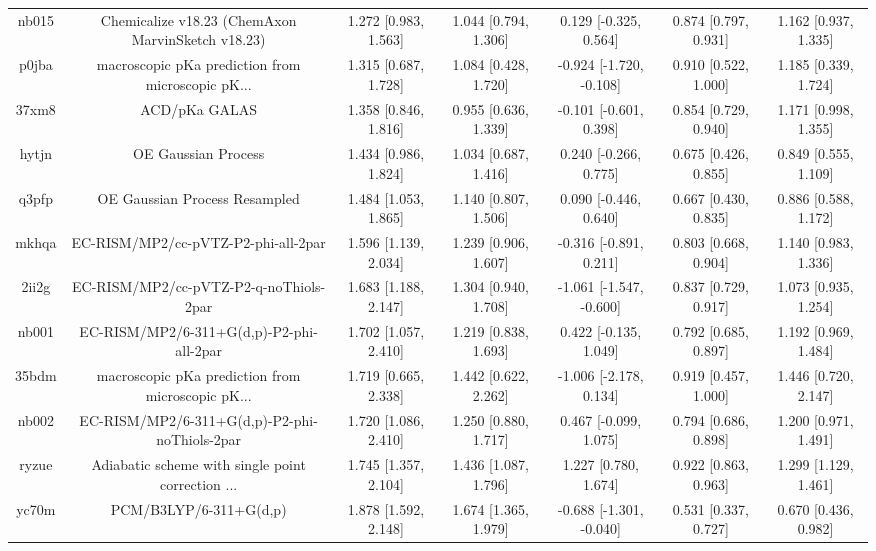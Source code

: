 \documentclass{article}
\begin{document}
\begin{center}
\begin{longtable}{|ccccccc|}
 nb015 &  Chemicalize v18.23 (ChemAxon MarvinSketch v18.23) &  1.272 [0.983, 1.563] &  1.044 [0.794, 1.306] &    0.129 [-0.325, 0.564] &  0.874 [0.797, 0.931] &   1.162 [0.937, 1.335] \\
 p0jba &  macroscopic pKa prediction from microscopic pK... &  1.315 [0.687, 1.728] &  1.084 [0.428, 1.720] &  -0.924 [-1.720, -0.108] &  0.910 [0.522, 1.000] &   1.185 [0.339, 1.724] \\
 37xm8 &                                      ACD/pKa GALAS &  1.358 [0.846, 1.816] &  0.955 [0.636, 1.339] &   -0.101 [-0.601, 0.398] &  0.854 [0.729, 0.940] &   1.171 [0.998, 1.355] \\
 hytjn &                                OE Gaussian Process &  1.434 [0.986, 1.824] &  1.034 [0.687, 1.416] &    0.240 [-0.266, 0.775] &  0.675 [0.426, 0.855] &   0.849 [0.555, 1.109] \\
 q3pfp &                      OE Gaussian Process Resampled &  1.484 [1.053, 1.865] &  1.140 [0.807, 1.506] &    0.090 [-0.446, 0.640] &  0.667 [0.430, 0.835] &   0.886 [0.588, 1.172] \\
 mkhqa &                EC-RISM/MP2/cc-pVTZ-P2-phi-all-2par &  1.596 [1.139, 2.034] &  1.239 [0.906, 1.607] &   -0.316 [-0.891, 0.211] &  0.803 [0.668, 0.904] &   1.140 [0.983, 1.336] \\
 2ii2g &             EC-RISM/MP2/cc-pVTZ-P2-q-noThiols-2par &  1.683 [1.188, 2.147] &  1.304 [0.940, 1.708] &  -1.061 [-1.547, -0.600] &  0.837 [0.729, 0.917] &   1.073 [0.935, 1.254] \\
 nb001 &           EC-RISM/MP2/6-311+G(d,p)-P2-phi-all-2par &  1.702 [1.057, 2.410] &  1.219 [0.838, 1.693] &    0.422 [-0.135, 1.049] &  0.792 [0.685, 0.897] &   1.192 [0.969, 1.484] \\
 35bdm &  macroscopic pKa prediction from microscopic pK... &  1.719 [0.665, 2.338] &  1.442 [0.622, 2.262] &   -1.006 [-2.178, 0.134] &  0.919 [0.457, 1.000] &   1.446 [0.720, 2.147] \\
 nb002 &      EC-RISM/MP2/6-311+G(d,p)-P2-phi-noThiols-2par &  1.720 [1.086, 2.410] &  1.250 [0.880, 1.717] &    0.467 [-0.099, 1.075] &  0.794 [0.686, 0.898] &   1.200 [0.971, 1.491] \\
 ryzue &  Adiabatic scheme with single point correction ... &  1.745 [1.357, 2.104] &  1.436 [1.087, 1.796] &     1.227 [0.780, 1.674] &  0.922 [0.863, 0.963] &   1.299 [1.129, 1.461] \\
 yc70m &                             PCM/B3LYP/6-311+G(d,p) &  1.878 [1.592, 2.148] &  1.674 [1.365, 1.979] &  -0.688 [-1.301, -0.040] &  0.531 [0.337, 0.727] &   0.670 [0.436, 0.982] \\

\end{longtable}
\end{center}
\end{document}

